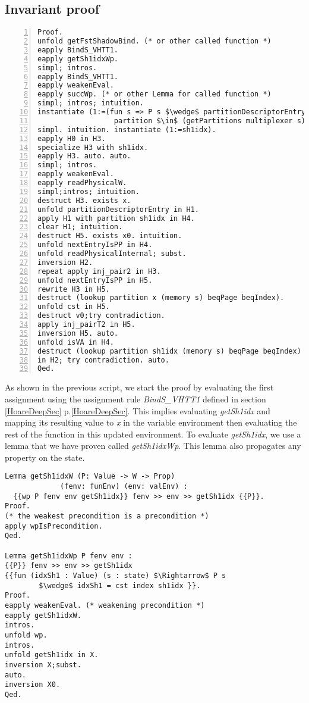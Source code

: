 \subsection{Invariant proof} \label{proof}
\begin{lstlisting}[caption = {proof of the getFstShadow invariant},xleftmargin=-.08\textwidth,
xrightmargin=-.08\textwidth,mathescape=true,numbers=left]
Proof.
unfold getFstShadowBind. (* or other called function *)
eapply BindS_VHTT1.
eapply getSh1idxWp.
simpl; intros.
eapply BindS_VHTT1.
eapply weakenEval.
eapply succWp. (* or other Lemma for called function *)
simpl; intros; intuition.
instantiate (1:=(fun s => P s $\wedge$ partitionDescriptorEntry s $\wedge$ 
                  partition $\in$ (getPartitions multiplexer s))).
simpl. intuition. instantiate (1:=sh1idx).
eapply H0 in H3.
specialize H3 with sh1idx.
eapply H3. auto. auto.
simpl; intros.
eapply weakenEval.
eapply readPhysicalW.
simpl;intros; intuition.
destruct H3. exists x.
unfold partitionDescriptorEntry in H1.
apply H1 with partition sh1idx in H4.
clear H1; intuition.
destruct H5. exists x0. intuition.
unfold nextEntryIsPP in H4.
unfold readPhysicalInternal; subst.
inversion H2.
repeat apply inj_pair2 in H3.
unfold nextEntryIsPP in H5.
rewrite H3 in H5.
destruct (lookup partition x (memory s) beqPage beqIndex).
unfold cst in H5.
destruct v0;try contradiction.
apply inj_pairT2 in H5.
inversion H5. auto.
unfold isVA in H4.
destruct (lookup partition sh1idx (memory s) beqPage beqIndex) 
in H2; try contradiction. auto.
Qed.
\end{lstlisting} 
As shown in the previous script, we start the proof by evaluating the first assignment using the assignment rule \textit{BindS\_VHTT1} defined in section \ref{HoareDeepSec} p.\ref{HoareDeepSec}. This implies evaluating \textit{getSh1idx} and mapping its resulting value to \textit{x} in the variable environment then evaluating the rest of the function in this updated environment. To evaluate \textit{getSh1idx}, we use a lemma that we have proven called \textit{getSh1idxWp}. This lemma also propagates any property on the state.
\begin{lstlisting}[caption = {getSh1idxWp lemma definition and proof},xleftmargin=-.06\textwidth,
xrightmargin=-.06\textwidth,mathescape=true]
Lemma getSh1idxW (P: Value -> W -> Prop) 
	         (fenv: funEnv) (env: valEnv) :
  {{wp P fenv env getSh1idx}} fenv >> env >> getSh1idx {{P}}.
Proof.
(* the weakest precondition is a precondition *)
apply wpIsPrecondition.
Qed.

Lemma getSh1idxWp P fenv env :
{{P}} fenv >> env >> getSh1idx 
{{fun (idxSh1 : Value) (s : state) $\Rightarrow$ P s  
	    $\wedge$ idxSh1 = cst index sh1idx }}.
Proof.
eapply weakenEval. (* weakening precondition *)
eapply getSh1idxW.
intros. 
unfold wp.
intros.
unfold getSh1idx in X.
inversion X;subst.
auto.
inversion X0.
Qed. 
\end{lstlisting} \vspace{4pt}

